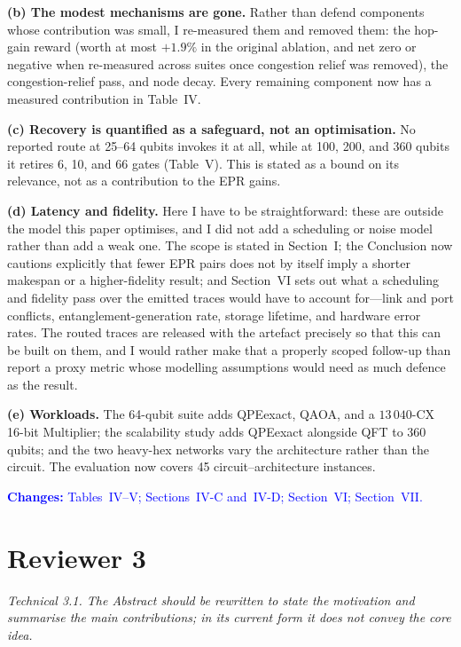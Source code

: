 \documentclass[11pt]{article}
\newenvironment{comment}{\medskip\noindent\itshape}{\par}
\newcommand{\where}[1]{\textcolor{blue}{\textbf{Changes:} #1}}
\begin{document}
\textbf{(b) The modest mechanisms are gone.} Rather than defend components
whose contribution was small, I re-measured them and removed them: the
hop-gain reward (worth at most $+1.9\%$ in the original ablation, and net zero
or negative when re-measured across suites once congestion relief was
removed), the congestion-relief pass, and node decay. Every remaining
component now has a measured contribution in Table~IV.

\textbf{(c) Recovery is quantified as a safeguard, not an optimisation.} No
reported route at 25--64 qubits invokes it at all, while at 100, 200, and 360
qubits it retires 6, 10, and 66 gates (Table~V). This is stated as a bound on
its relevance, not as a contribution to the EPR gains.

\textbf{(d) Latency and fidelity.} Here I have to be straightforward: these
are outside the model this paper optimises, and I did not add a scheduling or
noise model rather than add a weak one. The scope is stated in Section~I; the
Conclusion now cautions explicitly that fewer EPR pairs does not by itself
imply a shorter makespan or a higher-fidelity result; and Section~VI sets out
what a scheduling and fidelity pass over the emitted traces would have to
account for---link and port conflicts, entanglement-generation rate, storage
lifetime, and hardware error rates. The routed traces are released with the
artefact precisely so that this can be built on them, and I would rather make
that a properly scoped follow-up than report a proxy metric whose modelling
assumptions would need as much defence as the result.

\textbf{(e) Workloads.} The 64-qubit suite adds QPEexact, QAOA, and a
$13\,040$-CX 16-bit Multiplier; the scalability study adds QPEexact alongside
QFT to 360 qubits; and the two heavy-hex networks vary the architecture rather
than the circuit. The evaluation now covers 45 circuit--architecture
instances.

\where{Tables~IV--V; Sections~IV-C and~IV-D; Section~VI; Section~VII.}

\section*{Reviewer 3}

\begin{comment}
Technical 3.1. The Abstract should be rewritten to state the motivation and
summarise the main contributions; in its current form it does not convey the
core idea.
\end{comment}
\end{document}
